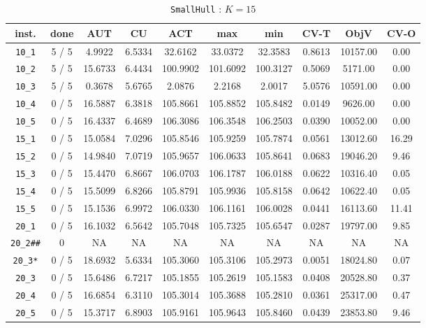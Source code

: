\begin{table}[h!]
\begin{center}
\small
\begin{tabular}{| c | c | c | c | c | c | c | c | c | c |}
\hline
inst. & done & AUT & CU & ACT & max & min & CV-T & ObjV & CV-O \\
\hline
\verb|10_1| & 5 / 5 & 4.9922 & 6.5334 & 32.6162 & 33.0372 & 32.3583 & 0.8613 & 10157.00 & 0.00\\ 
\verb|10_2| & 5 / 5 & 15.6733 & 6.4434 & 100.9902 & 101.6092 & 100.3127 & 0.5069 & 5171.00 & 0.00\\ 
\verb|10_3| & 5 / 5 & 0.3678 & 5.6765 & 2.0876 & 2.2168 & 2.0017 & 5.0576 & 10591.00 & 0.00\\ 
\verb|10_4| & 0 / 5 & 16.5887 & 6.3818 & 105.8661 & 105.8852 & 105.8482 & 0.0149 & 9626.00 & 0.00\\ 
\verb|10_5| & 0 / 5 & 16.4337 & 6.4689 & 106.3086 & 106.3548 & 106.2503 & 0.0390 & 10052.00 & 0.00\\ 
\verb|15_1| & 0 / 5 & 15.0584 & 7.0296 & 105.8546 & 105.9259 & 105.7874 & 0.0561 & 13012.60 & 16.29\\ 
\verb|15_2| & 0 / 5 & 14.9840 & 7.0719 & 105.9657 & 106.0633 & 105.8641 & 0.0683 & 19046.20 & 9.46\\ 
\verb|15_3| & 0 / 5 & 15.4470 & 6.8667 & 106.0703 & 106.1787 & 106.0188 & 0.0622 & 10316.40 & 0.05\\ 
\verb|15_4| & 0 / 5 & 15.5099 & 6.8266 & 105.8791 & 105.9936 & 105.8158 & 0.0642 & 10622.40 & 0.05\\ 
\verb|15_5| & 0 / 5 & 15.1536 & 6.9972 & 106.0330 & 106.1161 & 106.0028 & 0.0441 & 16113.60 & 11.41\\ 
\verb|20_1| & 0 / 5 & 16.1032 & 6.5642 & 105.7048 & 105.7325 & 105.6547 & 0.0287 & 19797.00 & 9.85\\ 
\verb|20_2##| & 0 & NA & NA & NA & NA & NA & NA & NA & NA \\ 
\verb|20_3*| & 0 / 5 & 18.6932 & 5.6334 & 105.3060 & 105.3106 & 105.2973 & 0.0051 & 18024.80 & 0.07\\ 
\verb|20_3| & 0 / 5 & 15.6486 & 6.7217 & 105.1855 & 105.2619 & 105.1583 & 0.0408 & 20528.80 & 0.37\\ 
\verb|20_4| & 0 / 5 & 16.6854 & 6.3110 & 105.3014 & 105.3688 & 105.2810 & 0.0361 & 25317.00 & 0.47\\ 
\verb|20_5| & 0 / 5 & 15.3717 & 6.8903 & 105.9161 & 105.9643 & 105.8460 & 0.0439 & 23853.80 & 9.46\\ 
\hline
\end{tabular}
\caption{\texttt{SmallHull} : $K = 15$}
\label{table:hull:15}
\end{center}
\end{table}

